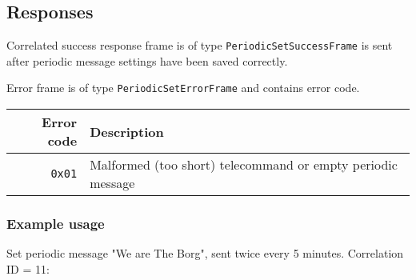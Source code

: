 \begin{tcarglist}
\end{tcarglist}

\subsection{Responses}
Correlated success response frame is of type \texttt{PeriodicSetSuccessFrame} is sent after periodic message settings have been saved correctly.

Error frame is of type \texttt{PeriodicSetErrorFrame} and contains error code. 

\begin{tabular}{r | l}
	Error code & Description \\ \hline
	\texttt{0x01} & Malformed (too short) telecommand or empty periodic message
\end{tabular}

\subsubsection{Example usage}
Set periodic message "We are The Borg", sent twice every 5 minutes. Correlation ID = 11:
